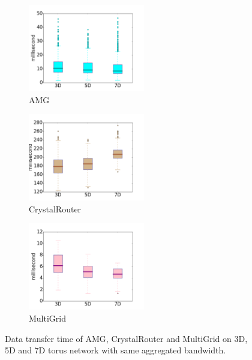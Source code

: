 \documentclass[conference]{IEEEtran}
\begin{document}
\begin{figure}[t!]
    \centering
    \begin{subfigure}[t]{0.32\textwidth}
        \centering
        \includegraphics[height=1.5in]{figs/samebdw/amg}
        \caption{AMG}
        \label{fig:samebd-amg}
    \end{subfigure}%
    \hspace{1em}%
    \begin{subfigure}[t]{0.32\textwidth}
        \centering
        \includegraphics[height=1.5in]{figs/samebdw/cr}
        \caption{CrystalRouter}
        \label{fig:samebd-cr}
    \end{subfigure}%
    \begin{subfigure}[t]{0.32\textwidth}
        \centering
        \includegraphics[height=1.5in]{figs/samebdw/mg}
        \caption{MultiGrid}
        \label{fig:samebd-mg}
    \end{subfigure}%
   \caption{Data transfer time of AMG, CrystalRouter and MultiGrid on 3D, 5D and 7D torus network with same aggregated bandwidth. }
   \label{fig: bandwidth-time-box}
\end{figure}
\end{document}
